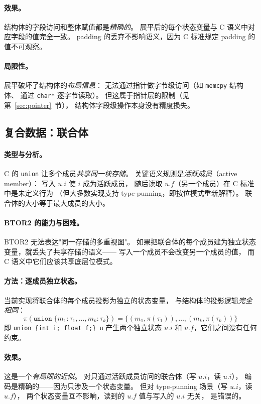 \documentclass[11pt,a4paper]{article}
\begin{document}
\paragraph{效果。}
结构体的字段访问和整体赋值都是\emph{精确的}。
展平后的每个状态变量与 C 语义中对应字段的值完全一致。
padding 的丢弃不影响语义，因为 C 标准规定 padding 的值不可观察。

\paragraph{局限性。}
展平破坏了结构体的\emph{布局信息}：
无法通过指针做字节级访问（如 \texttt{memcpy} 结构体、
通过 \texttt{char*} 逐字节读取）。
但这属于指针层的限制（见第~\ref{sec:pointer}~节），
结构体字段级操作本身没有精度损失。


\subsection{复合数据：联合体}
\label{sec:union}

\paragraph{类型与分析。}
C 的 \texttt{union} 让多个成员\emph{共享同一块存储}。
关键语义规则是\emph{活跃成员}（active member）：
写入 $u.i$ 使 $i$ 成为活跃成员，
随后读取 $u.f$（另一个成员）在 C 标准中是未定义行为
（但大多数实现支持 type-punning，即按位模式重新解释）。
联合体的大小等于最大成员的大小。

\paragraph{BTOR2 的能力与困难。}
BTOR2 无法表达"同一存储的多重视图"。
如果把联合体的每个成员建为独立状态变量，就丢失了共享存储的语义——
写入一个成员不会改变另一个成员的值，
而 C 语义中它们应该共享底层位模式。

\paragraph{方法：逐成员独立状态。}
当前实现将联合体的每个成员投影为独立的状态变量，
与结构体的投影逻辑\emph{完全相同}：
\[
\pi(\texttt{union}\;\{m_1{:}\tau_1, \ldots, m_k{:}\tau_k\})
= \{(m_1, \pi(\tau_1)), \ldots, (m_k, \pi(\tau_k))\}
\]
即 \texttt{union \{int i; float f;\} u} 产生两个独立状态
$u.i$ 和 $u.f$，它们之间没有任何约束。

\paragraph{效果。}
这是一个\emph{有局限的近似}。
对只通过活跃成员访问的联合体（写 $u.i$，读 $u.i$），
编码是精确的——因为只涉及一个状态变量。
但对 type-punning 场景（写 $u.i$，读 $u.f$），
两个状态变量互不影响，读到的 $u.f$ 值与写入的 $u.i$ 无关，
是错误的。
\end{document}
